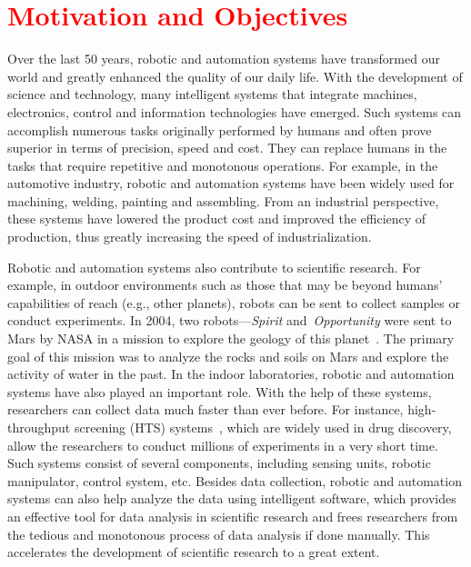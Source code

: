 \section{\textcolor{red}{Motivation and Objectives}}

Over the last 50 years, robotic and automation systems have transformed our world and greatly enhanced the quality of our daily life. With the development of science and technology, many intelligent systems that integrate machines, electronics, control and information technologies have emerged. Such systems can accomplish numerous tasks originally performed by humans and often prove superior in terms of precision, speed and cost. They can replace humans in the tasks that require repetitive and monotonous operations. For example, in the automotive industry, robotic and automation systems have been widely used for machining, welding, painting and assembling. From an industrial perspective, these systems have lowered the product cost and improved the efficiency of production, thus greatly increasing the speed of industrialization. 

Robotic and automation systems also contribute to scientific research. For example, in outdoor environments such as those that may be beyond humans' capabilities of reach (e.g., other planets), robots can be sent to collect samples or conduct experiments. In 2004, two robots---\textit{Spirit} and~\textit{Opportunity} were sent to Mars by NASA in a mission to explore the geology of this planet~\cite{Grotzinger:Sci:2014}. The primary goal of this mission was to analyze the rocks and soils on Mars and explore the activity of water in the past. In the indoor laboratories, robotic and automation systems have also played an important role. With the help of these systems, researchers can collect data much faster than ever before. For instance, high-throughput screening (HTS) systems~\cite{Hertzberg2000}, which are widely used in drug discovery, allow the researchers to conduct millions of experiments in a very short time. Such systems consist of several components, including sensing units, robotic manipulator, control system, etc. Besides data collection, robotic and automation systems can also help analyze the data using intelligent software, which provides an effective tool for data analysis in scientific research and frees researchers from the tedious and monotonous process of data analysis if done manually. This accelerates the development of scientific research to a great extent. 


